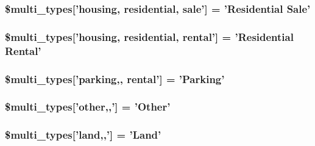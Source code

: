 \hypertarget{property__parts_8php_a415467622892231f6996a1a79be00b9b}{
\subsubsection[{\$multi\_\-types}]{\setlength{\rightskip}{0pt plus 5cm}\$multi\_\-types\mbox{[}'housing, residential, sale'\mbox{]} = 'Residential Sale'}}
\label{db/d70/property__parts_8php_a415467622892231f6996a1a79be00b9b}
\hypertarget{property__parts_8php_a6abbaf78939f062bf5c79379cbe877d2}{
\subsubsection[{\$multi\_\-types}]{\setlength{\rightskip}{0pt plus 5cm}\$multi\_\-types\mbox{[}'housing, residential, rental'\mbox{]} = 'Residential Rental'}}
\label{db/d70/property__parts_8php_a6abbaf78939f062bf5c79379cbe877d2}
\hypertarget{property__parts_8php_adb9d81733515b43316891a8690626f8a}{
\subsubsection[{\$multi\_\-types}]{\setlength{\rightskip}{0pt plus 5cm}\$multi\_\-types\mbox{[}'parking,, rental'\mbox{]} = 'Parking'}}
\label{db/d70/property__parts_8php_adb9d81733515b43316891a8690626f8a}
\hypertarget{property__parts_8php_adb418ac26e935420125e9b43c66002d5}{
\subsubsection[{\$multi\_\-types}]{\setlength{\rightskip}{0pt plus 5cm}\$multi\_\-types\mbox{[}'other,,'\mbox{]} = 'Other'}}
\label{db/d70/property__parts_8php_adb418ac26e935420125e9b43c66002d5}
\hypertarget{property__parts_8php_a13fb2935c84b64bd46b19bd98d2449e7}{
\subsubsection[{\$multi\_\-types}]{\setlength{\rightskip}{0pt plus 5cm}\$multi\_\-types\mbox{[}'land,,'\mbox{]} = 'Land'}}
